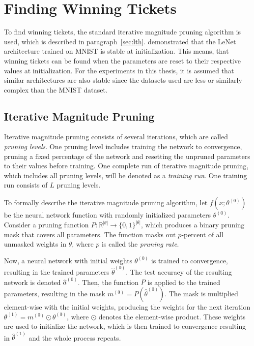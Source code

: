 \section{Finding Winning Tickets}
To find winning tickets, the standard iterative magnitude pruning algorithm is used, which is described in paragraph~\ref{sec:lth}.
\textcite{LinearModeConnectivity} demonstrated that the LeNet architecture trained on MNIST is stable at initialization.
This means, that winning tickets can be found when the parameters are reset to their respective values at initialization.
For the experiments in this thesis, it is assumed that similar architectures are also stable since the datasets used are less or similarly complex than the MNIST dataset.

\subsection{Iterative Magnitude Pruning}
Iterative magnitude pruning consists of several iterations, which are called  \textit{pruning levels}.
One pruning level includes training the network to convergence, pruning a fixed percentage of the network and resetting the unpruned parameters to their values before training.
One complete run of iterative magnitude pruning, which includes all pruning levels, will be denoted as a \textit{training run}.
One training run consists of $L$ pruning levels.

To formally describe the iterative magnitude pruning algorithm, let $f(x; \theta^{(0)})$ be the neural network function with randomly initialized parameters $\theta^{(0)}$.
Consider a pruning function $\textit{P}: \mathbb{R}^{|\theta|} \to {\{0,1\}}^{|\theta|}$, which produces a binary pruning mask that covers all parameters.
The function masks out $p$-percent of all unmasked weights in $\theta$, where $p$ is called the \textit{pruning rate}.

Now, a neural network with initial weights $\theta^{(0)}$ is trained to convergence, resulting in the trained parameters $\hat \theta^{(0)}$.
The test accuracy of the resulting network is denoted $\hat a^{(0)}$.
Then, the function $\textit{P}$ is applied to the trained parameters, resulting in the mask $m^{(0)} = \textit{P}(\hat \theta^{(0)})$.
The mask is multiplied element-wise with the initial weights, producing the weights for the next iteration $\theta^{(1)} = m^{(0)} \odot \theta^{(0)}$, where $\odot$ denotes the element-wise product.
These weights are used to initialize the network, which is then trained to convergence resulting in $\hat \theta^{(1)}$ and the whole process repeats.

